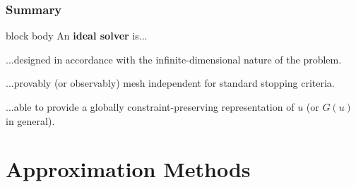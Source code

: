 \documentclass[aspectratio=169,xcolor=dvipsnames,11pt]{beamer}
\begin{document}
 \begin{frame}\frametitle{Summary}
      \begin{beamercolorbox}[rounded=true, shadow=true, wd=\textwidth]{block body}
An \alert{\bf{ideal solver}} is...\medskip

...designed in accordance with the infinite-dimensional nature of the problem.\medskip

...provably (or observably) mesh independent for standard stopping criteria.\medskip

...able to provide a globally constraint-preserving representation of $u$ (or $G(u)$ in general).
 \end{beamercolorbox}
 \hfill
{}
 \end{frame}


\section{Approximation Methods}
\end{document}
